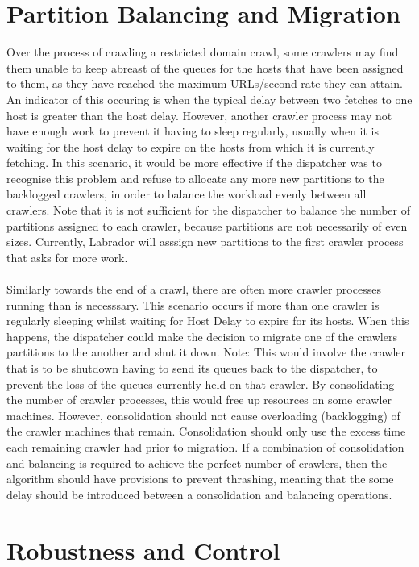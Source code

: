 \section{Partition Balancing and Migration}
Over the process of crawling a restricted domain crawl, some crawlers may find them unable to keep abreast of the queues for the hosts that have been assigned to them, as they have reached the maximum URLs/second rate they can attain. An indicator of this occuring is when the typical delay between two fetches to one host is greater than the host delay. However, another crawler process may not have enough work to prevent it having to sleep regularly, usually when it is waiting for the host delay to expire on the hosts from which it is currently fetching. In this scenario, it would be more effective if the dispatcher was to recognise this problem and refuse to allocate any more new partitions to the backlogged crawlers, in order to balance the workload evenly between all crawlers. Note that it is not sufficient for the dispatcher to balance the number of partitions assigned to each crawler, because partitions are not necessarily of even sizes. Currently, Labrador will asssign new partitions to the first crawler process that asks for more work. \\
\ \\
Similarly towards the end of a crawl, there are often more crawler processes running than is necesssary. This scenario occurs if more than one crawler is regularly sleeping whilst waiting for Host Delay to expire for its hosts. When this happens, the dispatcher could make the decision to migrate one of the crawlers partitions to the another and shut it down. Note: This would involve the crawler that is to be shutdown having to send its queues back to the dispatcher, to prevent the loss of the queues currently held on that crawler. By consolidating the number of crawler processes, this would free up resources on some crawler machines. However, consolidation should not cause overloading (backlogging) of the crawler machines that remain. Consolidation should only use the excess time each remaining crawler had prior to migration. If a combination of consolidation and balancing is required to achieve the perfect number of crawlers, then the algorithm should have provisions to prevent thrashing, meaning that the some delay should be introduced between a consolidation and balancing operations.

\section{Robustness and Control}
